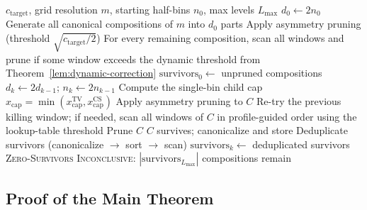 \documentclass[11pt, letterpaper]{article}
\theoremstyle{paperplain}
\theoremstyle{paperdef}
\begin{document}
\begin{algorithm}[H]
\caption{Cascade Search For Terminal Coverage}
\label{alg:cascade}
\begin{algorithmic}[1]
\Require $c_{\text{target}}$, grid resolution $m$, starting half-bins
  $n_0$, max levels $L_{\max}$
\State $d_0 \gets 2 n_0$
\State Generate all canonical compositions of $m$ into $d_0$ parts
\State Apply asymmetry pruning (threshold
  $\sqrt{c_{\text{target}}/2}$)
\State For every remaining composition, scan all windows and prune if
  some window exceeds the dynamic threshold from
  Theorem~\ref{lem:dynamic-correction}
\State $\text{survivors}_0 \gets$ unpruned compositions
  \State $d_k \gets 2 d_{k-1}$; \quad
    $n_k \gets 2 n_{k-1}$
  \State Compute the single-bin child cap
    $x_{\text{cap}} = \min(x_{\text{cap}}^{\mathrm{TV}},
    x_{\text{cap}}^{\mathrm{CS}})$
      \State Apply asymmetry pruning to $C$
        \State Re-try the previous killing window; if needed, scan all windows of $C$ in profile-guided order using the lookup-table threshold
          \State Prune $C$
        \Else
          \State $C$ survives; canonicalize and store
        \EndIf
      \EndIf
    \EndFor
  \EndFor
  \State Deduplicate survivors (canonicalize $\to$ sort $\to$ scan)
  \State $\text{survivors}_k \gets$ deduplicated survivors
    \State \Return \textsc{Zero-Survivors}
  \EndIf
\EndFor
\State \Return \textsc{Inconclusive}:
  $|\text{survivors}_{L_{\max}}|$ compositions remain
\end{algorithmic}
\end{algorithm}

\subsection{Proof of the Main Theorem}
\end{document}
